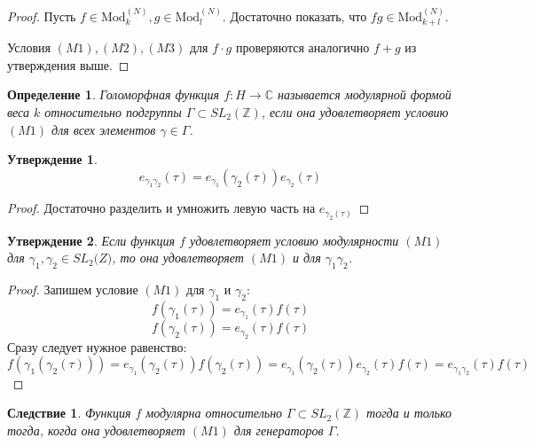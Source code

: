\documentclass{article}
\newcommand{\ZZ}{\mathbb{Z}}
\newcommand{\CC}{\mathbb{C}}
\theoremstyle{break}
\newtheorem{definition}[theorem]{Определение}
\newtheorem{claim}{Утверждение}[section]
\newtheorem{corollary}{Следствие}[section] %
\newcommand{\ModkN}[2]{\text{Mod}_{#1}^{(#2)}}
\begin{document}
\begin{proof}
	Пусть $f \in \ModkN{k}{N}, g \in \ModkN{l}{N}$. Достаточно показать, что 
	$fg \in \ModkN{k+l}{N}$. 
	
	Условия $(M1), (M2), (M3)$ для $f \cdot g$ проверяются аналогично $f+g$ из утверждения выше.
\end{proof}


\begin{definition}
	Голоморфная функция $f: H \to \CC$ называется модулярной формой веса $k$ относительно подгруппы $\Gamma \subset SL_2(\ZZ)$, если она удовлетворяет условию $(M1)$ для всех элементов $\gamma \in \Gamma$.
\end{definition}


\begin{claim}
	\begin{equation}
	e_{\gamma_1 \gamma_2}(\tau) = e_{\gamma_1}(\gamma_2(\tau)) e_{\gamma_2}(\tau)
	\end{equation}
\end{claim}
\begin{proof}
	Достаточно разделить и умножить левую часть на $e_{\gamma_2(\tau)}$
\end{proof}

\begin{claim}
	Если функция $f$ удовлетворяет условию модулярности $(M1)$ для $\gamma_1, \gamma_2 \in SL_2\big(Z)$, то она удовлетворяет $(M1)$ и для $\gamma_1 \gamma_2$.
\end{claim}

\begin{proof}
	Запишем условие $(M1)$ для $\gamma_1$ и $\gamma_2$:
	\begin{equation}
	f(\gamma_1(\tau)) = e_{\gamma_1}(\tau) f(\tau)
	\end{equation}
	\begin{equation}
	f(\gamma_2(\tau)) = e_{\gamma_2}(\tau) f(\tau)
	\end{equation}
	Сразу следует нужное равенство: 
	\begin{equation}
	f(\gamma_1(\gamma_2(\tau))) = e_{\gamma_1}(\gamma_2(\tau)) f(\gamma_2(\tau))
	= e_{\gamma_1}(\gamma_2(\tau)) e_{\gamma_2}(\tau) f(\tau) 
	= e_{\gamma_1 \gamma_2}(\tau) f(\tau)
	\end{equation}
\end{proof}


\begin{corollary}
	Функция $f$ модулярна относительно $\Gamma \subset SL_2(\ZZ)$ тогда и только тогда, когда она удовлетворяет $(M1)$ для генераторов $\Gamma$.
\end{corollary}
\end{document}

